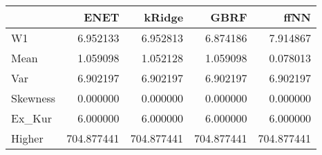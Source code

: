 \begin{tabular}{lrrrr}
\toprule
{} &        ENET &      kRidge &        GBRF &        ffNN \\
\midrule
W1       &    6.952133 &    6.952813 &    6.874186 &    7.914867 \\
Mean     &    1.059098 &    1.052128 &    1.059098 &    0.078013 \\
Var      &    6.902197 &    6.902197 &    6.902197 &    6.902197 \\
Skewness &    0.000000 &    0.000000 &    0.000000 &    0.000000 \\
Ex\_Kur   &    6.000000 &    6.000000 &    6.000000 &    6.000000 \\
Higher   &  704.877441 &  704.877441 &  704.877441 &  704.877441 \\
\bottomrule
\end{tabular}
